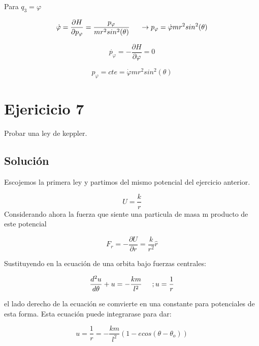 \documentclass[12 pt]{article}
\begin{document}
Para $q_{3} = \varphi$


\begin{equation*}
\dot{\varphi}= \frac{\partial H }{ \partial p_{\varphi}}= \frac{p_{\varphi}}{mr^{2}sin^{2}(\theta)} \hspace{0.5cm} \rightarrow p_{\varphi} = \dot{\varphi}mr^{2}sin^{2}(\theta)
\end{equation*}

 \begin{equation*}
 \dot{p_{\varphi}} = -\frac{\partial H }{ \partial \varphi}= 0 
 \end{equation*}

\begin{equation*}
p_{\varphi} = cte = \dot{\varphi}mr^{2}sin^{2}(\theta)
\end{equation*}


\section*{Ejericicio 7}
Probar una ley de keppler.

\subsection*{Solución}
Escojemos la primera ley y partimos del mismo potencial del ejercicio anterior.

\begin{equation*}
U = \frac{k}{r}
\end{equation*}
Considerando ahora la fuerza que siente una particula de masa m producto de este potencial

\begin{equation*}
F_{r} = -\frac{\partial U }{\partial r} = \frac{k}{r^{2}} \hat{r}
\end{equation*}


Sustituyendo en la ecuación de una orbita bajo fuerzas centrales: 


\begin{equation*}
\frac{d^{2}u}{d\theta} + u = -\frac{km}{l^{2}}  \hspace{0.5 cm}  ; u = \frac{1}{r}
\end{equation*}


el lado derecho de la ecuación se comvierte en una constante para potenciales de esta forma. Esta ecuación puede integrarase para dar:

\begin{equation*}
u = \frac{1}{r}= -\frac{km}{l^{2}} \left( 1 - e cos(\theta -\theta_{o}) \right) 
\end{equation*}
\end{document}
